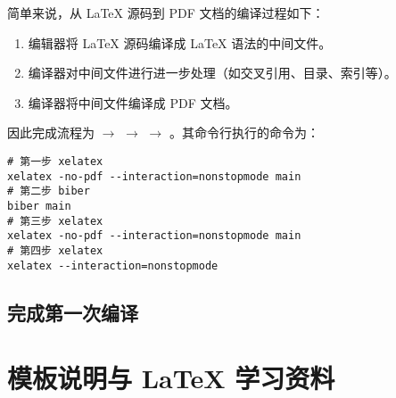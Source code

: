 简单来说，从 \LaTeX{} 源码到 PDF 文档的编译过程如下：
\begin{enumerate}
  \item 编辑器将 \LaTeX{} 源码编译成 \LaTeX{} 语法的中间文件。
  \item 编译器对中间文件进行进一步处理（如交叉引用、目录、索引等）。
  \item 编译器将中间文件编译成 PDF 文档。
\end{enumerate}

因此完成流程为   $\rightarrow$  $\rightarrow$  $\rightarrow$  。其命令行执行的命令为：

\begin{verbatim}
# 第一步 xelatex
xelatex -no-pdf --interaction=nonstopmode main
# 第二步 biber
biber main
# 第三步 xelatex
xelatex -no-pdf --interaction=nonstopmode main
# 第四步 xelatex
xelatex --interaction=nonstopmode

\end{verbatim}

\subsection{完成第一次编译}

\section{模板说明与 LaTeX 学习资料}

